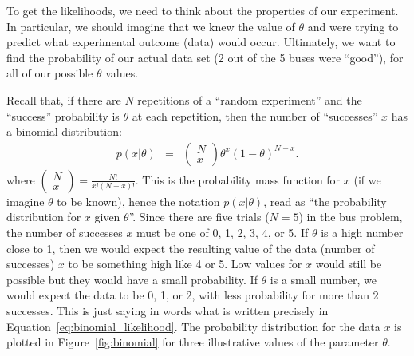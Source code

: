 To get the likelihoods, we need to think about the properties of our experiment.
In particular, we should imagine that we knew the value of $\theta$ and were
trying to predict what experimental outcome (data) would occur. Ultimately,
we want to find the probability of our actual data set (2 out of the 5 buses
were ``good''), for all of our possible $\theta$ values.

Recall that,
if there are $N$
repetitions of a ``random experiment'' and the ``success'' probability is
$\theta$ at each repetition,
then the number of ``successes'' $x$ has a binomial distribution:
\begin{eqnarray}
p(x|\theta) &=& \left(\begin{array}{c}N \\ x\end{array}\right)
\theta^x\left(1-\theta\right)^{N - x}.\label{eq:binomial_likelihood2}
\end{eqnarray}
where $\left(\begin{array}{c}N \\ x\end{array}\right) = \frac{N!}{x!(N-x)!}$.
This is the probability mass function for $x$ (if we imagine $\theta$ to be known), hence the notation $p(x|\theta)$, read as ``the probability distribution for $x$ given $\theta$''.
Since there are five trials
($N=5$) in the bus problem, the number of successes $x$ must be one of
0, 1, 2, 3, 4, or 5.
If $\theta$ is a high number close to 1, then we would expect the resulting
value of the data (number of successes) $x$ to be something high like 4 or 5. Low values for $x$ would
still be possible but they would have a small probability. If $\theta$ is a
small number, we would expect the data to be 0, 1, or 2, with less probability
for more than 2 successes. This is just saying in words what is written
precisely in Equation~\ref{eq:binomial_likelihood}. The probability distribution
for the data $x$ is plotted in Figure~\ref{fig:binomial} for three illustrative
values of the parameter $\theta$.

